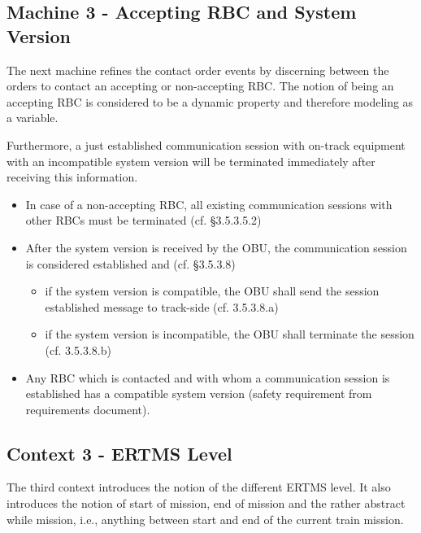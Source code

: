 \documentclass[10pt,a4paper]{article}
\begin{document}


\subsection{Machine 3 - Accepting RBC and System Version}
\label{sec:machine-3-accepting}

The next machine refines the contact order events by discerning between the
orders to contact an accepting or non-accepting RBC. The notion of being an
accepting RBC is considered to be a dynamic property and therefore modeling as a
variable.

Furthermore, a just established communication session with on-track equipment
with an incompatible system version will be terminated immediately after
receiving this information.

\begin{itemize}
\item In case of a non-accepting RBC, all existing communication sessions with
  other RBCs must be terminated (cf. §3.5.3.5.2)
\item After the system version  is received by the OBU, the communication
  session is considered established and (cf. §3.5.3.8)
  \begin{itemize}
  \item if the system version is compatible, the OBU shall send the session
    established message to track-side (cf. 3.5.3.8.a)
  \item if the system version is incompatible, the OBU shall terminate the
    session (cf. 3.5.3.8.b)
  \end{itemize}
\item Any RBC which is contacted and with whom a communication session is
  established has a compatible system version (safety requirement from
  requirements document).
\end{itemize}



\subsection{Context 3 - ERTMS Level}
\label{sec:context-3-ertms}

The third context introduces the notion of the different ERTMS level. It also
introduces the notion of start of mission, end of mission and the rather
abstract while mission, i.e., anything between start and end of the current
train mission.
\end{document}

